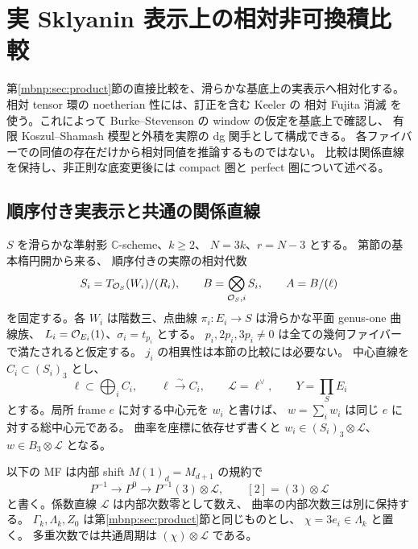 \section{実 Sklyanin 表示上の相対非可換積比較}
\label{mbrn:sec:relative-nc}

第\ref{mbnp:sec:product}節の直接比較を、滑らかな基底上の実表示へ相対化する。
相対 tensor 環の noetherian 性には、訂正を含む Keeler の
相対 Fujita 消滅\cite[Theorem~1.5, Definition~2.9, Theorem~E2.5]{NFMKeelerAmple}
を使う。これによって Burke--Stevenson の window の仮定を基底上で確認し、
有限 Koszul--Shamash 模型と外積を実際の dg 関手として構成できる。
各ファイバーでの同値の存在だけから相対同値を推論するものではない。
比較は関係直線を保持し、非正則な底変更後には compact 圏と perfect 圏について述べる。

\subsection{順序付き実表示と共通の関係直線}

$S$ を滑らかな準射影 $\mathbb C$-scheme、$k\geq2$、
$N=3k$、$r=N-3$ とする。
第節の基本楕円開から来る、
順序付きの実際の相対代数
\[
 S_i=T_{\mathcal O_S}(W_i)/(R_i),\qquad
 B=\bigotimes_{\mathcal O_S,i}S_i,\qquad A=B/(\ell)
\]
を固定する。各 $W_i$ は階数三、点曲線
$\pi_i:E_i\to S$ は滑らかな平面 genus-one 曲線族、
$L_i=\mathcal O_{E_i}(1)$、$\sigma_i=t_{p_i}$ とする。
$p_i,2p_i,3p_i\ne0$ は全ての幾何ファイバーで満たされると仮定する。
$j_i$ の相異性は本節の比較には必要ない。
中心直線を $C_i\subset(S_i)_3$ とし、
\begin{equation}\label{mbrn:eq:relation-line}
 \ell\subset\bigoplus_i C_i,\qquad
 \ell\xrightarrow{\sim}C_i,\qquad
 \mathscr L=\ell^\vee,\qquad Y=\prod_SE_i
\end{equation}
とする。局所 frame $e$ に対する中心元を $w_i$ と書けば、
$w=\sum_iw_i$ は同じ $e$ に対する総中心元である。
曲率を座標に依存せず書くと
$w_i\in(S_i)_3\otimes\mathscr L$、
$w\in B_3\otimes\mathscr L$ となる。

以下の MF は内部 shift $M(1)_d=M_{d+1}$ の規約で
\begin{equation}\label{mbrn:eq:mf-period}
 P^{-1}\longrightarrow P^0\longrightarrow
           P^{-1}(3)\otimes\mathscr L,\qquad
 [2]=(3)\otimes\mathscr L
\end{equation}
と書く。係数直線 $\mathscr L$ は内部次数零として数え、
曲率の内部次数三は別に保持する。
$\Gamma_k,\Lambda_k,Z_0$ は第\ref{mbnp:sec:product}節と同じものとし、
$\chi=3e_i\in\Lambda_k$ と置く。
多重次数では共通周期は $(\chi)\otimes\mathscr L$ である。

